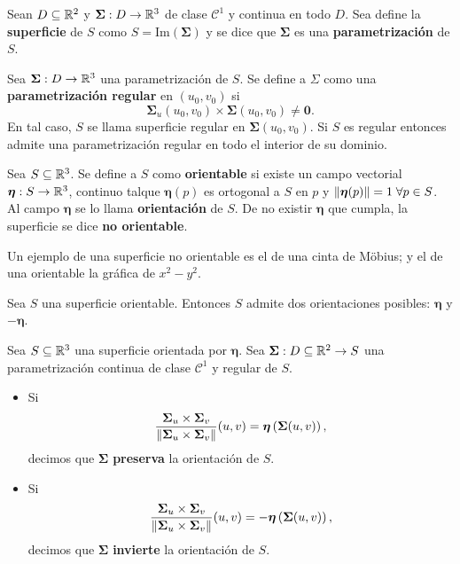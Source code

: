 \begin{definition}
    Sean $D\subseteq\mathbb{R}^2$ y $\boldsymbol{\Sigma}:D\to\mathbb{R}^3$ de clase $\mathcal{C}^1$ y continua en todo $D$. Sea define la \textbf{superficie} de $S$ como $S=\text{Im}(\boldsymbol{\Sigma})$ y se dice que $\boldsymbol{\Sigma}$ es una \textbf{parametrizaci\'on} de $S$.
\end{definition}

\begin{definition}
    Sea $\boldsymbol{\Sigma}:D\to\mathbb{R}^3$ una parametrizaci\'on de $S$. Se define a $\Sigma$ como una \textbf{parametrizaci\'on regular} en $(u_0, v_0)$ si
    \[
        \boldsymbol{\Sigma}_u(u_0,v_0)\times\boldsymbol{\Sigma}(u_0,v_0)\neq \boldsymbol{0}.
    \]
    En tal caso, $S$ se llama superficie regular en $\boldsymbol{\Sigma}(u_0,v_0)$. Si $S$ es regular entonces admite una parametrizaci\'on regular en todo el interior de su dominio.
\end{definition}

\begin{definition}
    Sea $S\subseteq\mathbb{R}^3$. Se define a $S$ como \textbf{orientable} si existe un campo vectorial $\boldsymbol{\eta}:S\to\mathbb{R}^3$, continuo talque $\boldsymbol{\eta}(p)$ es ortogonal a $S$ en $p$ y $\norm{\boldsymbol{\eta}(p)}=1\;\forall p\in S$. Al campo $\boldsymbol{\eta}$ se lo llama \textbf{orientaci\'on} de $S$. De no existir $\boldsymbol{\eta}$ que cumpla, la superficie se dice \textbf{no orientable}.
\end{definition}

\begin{example} Un ejemplo de una superficie no orientable es el de una cinta de Möbius; y el de una orientable la gr\'afica de $x^2-y^2$.

\end{example}

\begin{obs}
    Sea $S$ una superficie orientable. Entonces $S$ admite dos orientaciones posibles: $\boldsymbol{\eta}$ y $-\boldsymbol{\eta}$.
\end{obs}

\begin{definition}
    Sea $S\subseteq\mathbb{R}^3$ una superficie orientada por $\boldsymbol{\eta}$. Sea $\boldsymbol{\Sigma}:D\subseteq\mathbb{R}^2\to S$ una parametrizaci\'on continua de clase $\mathcal{C}^1$ y regular de $S$.
    \begin{itemize}
        \item Si \[
            \frac{\boldsymbol{\Sigma}_u\times\boldsymbol{\Sigma}_v}{\norm{\boldsymbol{\Sigma}_u\times\boldsymbol{\Sigma}_v}}(u,v)=\boldsymbol{\eta}\left(\boldsymbol{\Sigma}(u,v)\right),
        \]  
        decimos que $\boldsymbol{\Sigma}$ \textbf{preserva} la orientaci\'on de $S$.
        \item Si \[
            \frac{\boldsymbol{\Sigma}_u\times\boldsymbol{\Sigma}_v}{\norm{\boldsymbol{\Sigma}_u\times\boldsymbol{\Sigma}_v}}(u,v)=-\boldsymbol{\eta}\left(\boldsymbol{\Sigma}(u,v)\right),
        \]
        decimos que $\boldsymbol{\Sigma}$ \textbf{invierte} la orientaci\'on de $S$.  
    \end{itemize}
\end{definition}

